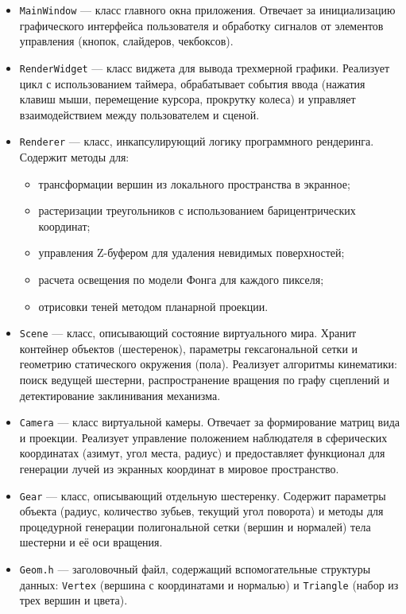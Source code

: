 \begin{itemize}
	\item \texttt{MainWindow} — класс главного окна приложения. Отвечает за инициализацию графического интерфейса пользователя и обработку сигналов от элементов управления (кнопок, слайдеров, чекбоксов).

	\item \texttt{RenderWidget} — класс виджета для вывода трехмерной графики. Реализует цикл с использованием таймера, обрабатывает события ввода (нажатия клавиш мыши, перемещение курсора, прокрутку колеса) и управляет взаимодействием между пользователем и сценой.

	\item \texttt{Renderer} — класс, инкапсулирующий логику программного рендеринга. Содержит методы для:
	      \begin{itemize}
		      \item трансформации вершин из локального пространства в экранное;
		      \item растеризации треугольников с использованием барицентрических координат;
		      \item управления Z-буфером для удаления невидимых поверхностей;
		      \item расчета освещения по модели Фонга для каждого пикселя;
		      \item отрисовки теней методом планарной проекции.
	      \end{itemize}

	\item \texttt{Scene} — класс, описывающий состояние виртуального мира. Хранит контейнер объектов (шестеренок), параметры гексагональной сетки и геометрию статического окружения (пола). Реализует алгоритмы кинематики: поиск ведущей шестерни, распространение вращения по графу сцеплений и детектирование заклинивания механизма.

	\item \texttt{Camera} — класс виртуальной камеры. Отвечает за формирование матриц вида и проекции. Реализует управление положением наблюдателя в сферических координатах (азимут, угол места, радиус) и предоставляет функционал для генерации лучей из экранных координат в мировое пространство.

	\item \texttt{Gear} — класс, описывающий отдельную шестеренку. Содержит параметры объекта (радиус, количество зубьев, текущий угол поворота) и методы для процедурной генерации полигональной сетки (вершин и нормалей) тела шестерни и её оси вращения.

	\item \texttt{Geom.h} — заголовочный файл, содержащий вспомогательные структуры данных: \texttt{Vertex} (вершина с координатами и нормалью) и \texttt{Triangle} (набор из трех вершин и цвета).
\end{itemize}

